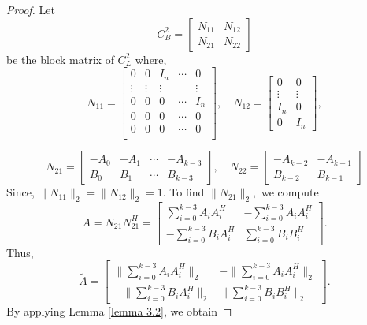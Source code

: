 \documentclass [12pt]{article}
\begin{document}
\begin{proof}
   Let
\[
C^{2}_{B} = \begin{bmatrix} N_{11} & N_{12} \\ N_{21} & N_{22} \end{bmatrix}
\] be the block matrix of $C^{2}_{L}$
where,
\[
N_{11} = 
\begin{bmatrix}
0 & 0 & I_n & \cdots & 0 \\
\vdots & \vdots  & \vdots &  &\vdots\\
0 & 0 & 0 & \cdots & I_n \\
0 & 0 & 0 & \cdots & 0 \\
0 & 0 & 0 & \cdots & 0 \\
\end{bmatrix}, \quad N_{12} = 
\begin{bmatrix}
0 &0 \\
\vdots&\vdots \\
I_n & 0\\ 0 & I_{n}
\end{bmatrix},
\]

\[
N_{21} = 
\begin{bmatrix}
-A_0 & -A_1 & \cdots & -A_{k-3}\\
B_0 & B_1 & \cdots & B_{k-3}
\end{bmatrix}, \quad N_{22} = \begin{bmatrix}
    -A_{k-2}&-A_{k-1}\\B_{k-2}&B_{k-1}\end{bmatrix}
\]
Since, $\|N_{11}\|_{2}=\|N_{12}\|_{2}=1.$
To find $\|N_{21}\|_{2},$ we compute  \[
A=N_{21}N_{21}^{H} = 
\begin{bmatrix}
\sum_{i=0}^{k-3} A_{i}A_{i}^{H}& -\sum_{i=0}^{k-3}A_{i}A_{i}^{H}  \\
 -\sum_{i=0}^{k-3} B_{i}A_{i}^{H}& \sum_{i=0}^{k-3} B_{i}B_{i}^{H}
\end{bmatrix}. \]
Thus, \[\tilde{A}= 
\begin{bmatrix}
\|\sum_{i=0}^{k-3} A_{i}A_{i}^{H}\|_{2}& -\|\sum_{i=0}^{k-3}A_{i}A_{i}^{H}\|_{2}  \\
 -\|\sum_{i=0}^{k-3} B_{i}A_{i}^{H}\|_{2}& \|\sum_{i=0}^{k-3} B_{i}B_{i}^{H}\|_{2}
\end{bmatrix}. \] By applying Lemma \ref{lemma 3.2}, we obtain 


\end{proof}
\end{document}
